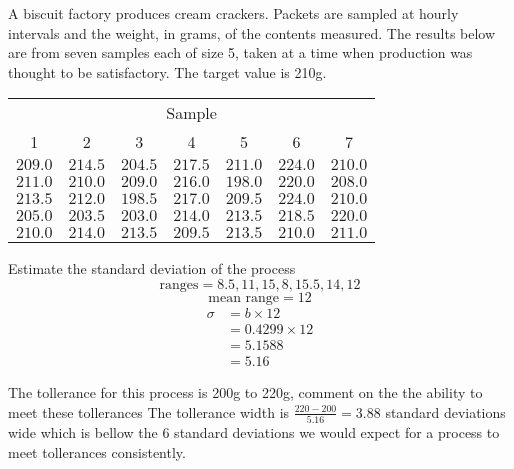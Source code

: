         \begin{example}
        {
            A biscuit factory produces cream crackers. Packets are sampled at hourly intervals and the weight, in grams, of the contents measured. The results below are from seven samples each of size 5, taken at a time when production was thought to be satisfactory. The target value is 210g.

            \begin{center}
            \begin{tabular}{c|c|c|c|c|c|c}
            \multicolumn{7}{c}{Sample}\\
            1         & 2         & 3         & 4         & 5         & 6         & 7         \\
            \hline
            $209.0$   & $214.5$   & $204.5$   & $217.5$   & $211.0$   & $224.0$   & $210.0$   \\
            $211.0$   & $210.0$   & $209.0$   & $216.0$   & $198.0$   & $220.0$   & $208.0$   \\
            $213.5$   & $212.0$   & $198.5$   & $217.0$   & $209.5$   & $224.0$   & $210.0$   \\
            $205.0$   & $203.5$   & $203.0$   & $214.0$   & $213.5$   & $218.5$   & $220.0$   \\
            $210.0$   & $214.0$   & $213.5$   & $209.5$   & $213.5$   & $210.0$   & $211.0$   \\
            \end{tabular}
            \end{center}
        }

        \begin{step}{Estimate the standard deviation of the process}
        $$\text{ranges} = 8.5, 11, 15, 8, 15.5, 14, 12$$
        $$\text{mean range} = 12$$
        \begin{align*}
        \sigma &= b \times 12 \\
        &= 0.4299 \times 12 \\
        &= 5.1588 \\
        &= 5.16
        \end{align*}
        \end{step}

        \begin{step}{The tollerance for this process is 200g to 220g, comment on the the ability to meet these tollerances}
        The tollerance width is $\displaystyle\frac{220 - 200}{5.16} = 3.88$ standard deviations wide which is bellow the 6 standard deviations we would expect for a process to meet tollerances consistently.
        \end{step}

        \end{example}


